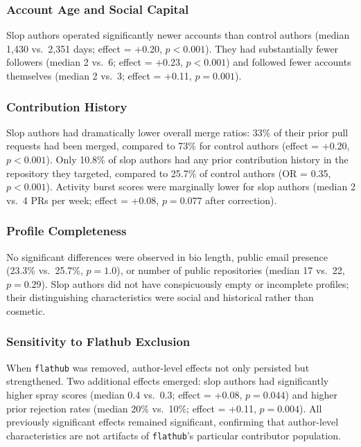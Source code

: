 \documentclass[11pt]{article}
\begin{document}
	\subsubsection{Account Age and Social Capital}
	
	Slop authors operated significantly newer accounts than control authors (median 1,430 vs.\ 2,351 days; effect = +0.20, $p < 0.001$). They had substantially fewer followers (median 2 vs.\ 6; effect = +0.23, $p < 0.001$) and followed fewer accounts themselves (median 2 vs.\ 3; effect = +0.11, $p = 0.001$).
	
	\subsubsection{Contribution History}
	
	Slop authors had dramatically lower overall merge ratios: 33\% of their prior pull requests had been merged, compared to 73\% for control authors (effect = +0.20, $p < 0.001$). Only 10.8\% of slop authors had any prior contribution history in the repository they targeted, compared to 25.7\% of control authors (OR = 0.35, $p < 0.001$). Activity burst scores were marginally lower for slop authors (median 2 vs.\ 4 PRs per week; effect = +0.08, $p = 0.077$ after correction).
	
	\subsubsection{Profile Completeness}
	
	No significant differences were observed in bio length, public email presence (23.3\% vs.\ 25.7\%, $p = 1.0$), or number of public repositories (median 17 vs.\ 22, $p = 0.29$). Slop authors did not have conspicuously empty or incomplete profiles; their distinguishing characteristics were social and historical rather than cosmetic.
	
	\subsubsection{Sensitivity to Flathub Exclusion}
	
	When \texttt{flathub} was removed, author-level effects not only persisted but strengthened. Two additional effects emerged: slop authors had significantly higher spray scores (median 0.4 vs.\ 0.3; effect = +0.08, $p = 0.044$) and higher prior rejection rates (median 20\% vs.\ 10\%; effect = +0.11, $p = 0.004$). All previously significant effects remained significant, confirming that author-level characteristics are not artifacts of \texttt{flathub}'s particular contributor population.
	
\end{document}
